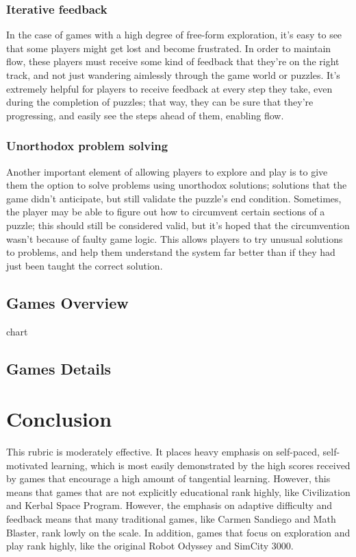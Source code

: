 \documentclass[12pt]{report}
\begin{document}
		\subsubsection{Iterative feedback}
			In the case of games with a high degree of free-form exploration, it's easy to see that some players might get lost and become frustrated. In order to maintain flow, these players must receive some kind of feedback that they're on the right track, and not just wandering aimlessly through the game world or puzzles. It's extremely helpful for players to receive feedback at every step they take, even during the completion of puzzles; that way, they can be sure that they're progressing, and easily see the steps ahead of them, enabling flow.
		\subsubsection{Unorthodox problem solving}
			Another important element of allowing players to explore and play is to give them the option to solve problems using unorthodox solutions; solutions that the game didn't anticipate, but still validate the puzzle's end condition. Sometimes, the player may be able to figure out how to circumvent certain sections of a puzzle; this should still be considered valid, but it's hoped that the circumvention wasn't because of faulty game logic. This allows players to try unusual solutions to problems, and help them understand the system far better than if they had just been taught the correct solution.

	\subsection{Games Overview}
		chart
	\subsection{Games Details}
		

\section{Conclusion}
	This rubric is moderately effective. It places heavy emphasis on self-paced, self-motivated learning, which is most easily demonstrated by the high scores received by games that encourage a high amount of tangential learning. However, this means that games that are not explicitly educational rank highly, like Civilization and Kerbal Space Program. However, the emphasis on adaptive difficulty and feedback means that many traditional games, like Carmen Sandiego and Math Blaster, rank lowly on the scale. In addition, games that focus on exploration and play rank highly, like the original Robot Odyssey and SimCity 3000.
\end{document}

